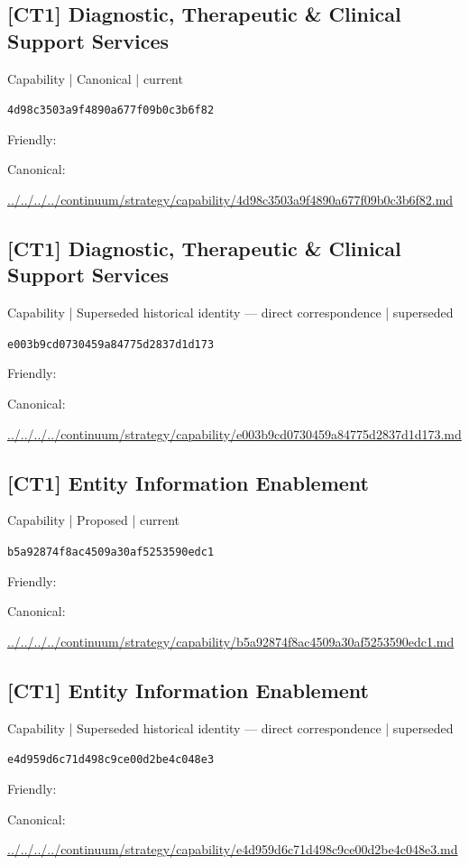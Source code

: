 \documentclass[10pt,a4paper]{article}
\begin{document}
\subsection*{[CT1] Diagnostic, Therapeutic \& Clinical Support Services}
{\small Capability | Canonical | current}\par
\texttt{4d98c3503a9f4890a677f09b0c3b6f82}\par
Friendly: \par
Canonical: \par
{\footnotesize\url{../../../../continuum/strategy/capability/4d98c3503a9f4890a677f09b0c3b6f82.md}}\par
\subsection*{[CT1] Diagnostic, Therapeutic \& Clinical Support Services}
{\small Capability | Superseded historical identity — direct correspondence | superseded}\par
\texttt{e003b9cd0730459a84775d2837d1d173}\par
Friendly: \par
Canonical: \par
{\footnotesize\url{../../../../continuum/strategy/capability/e003b9cd0730459a84775d2837d1d173.md}}\par
\subsection*{[CT1] Entity Information Enablement}
{\small Capability | Proposed | current}\par
\texttt{b5a92874f8ac4509a30af5253590edc1}\par
Friendly: \par
Canonical: \par
{\footnotesize\url{../../../../continuum/strategy/capability/b5a92874f8ac4509a30af5253590edc1.md}}\par
\subsection*{[CT1] Entity Information Enablement}
{\small Capability | Superseded historical identity — direct correspondence | superseded}\par
\texttt{e4d959d6c71d498c9ce00d2be4c048e3}\par
Friendly: \par
Canonical: \par
{\footnotesize\url{../../../../continuum/strategy/capability/e4d959d6c71d498c9ce00d2be4c048e3.md}}\par
\end{document}
